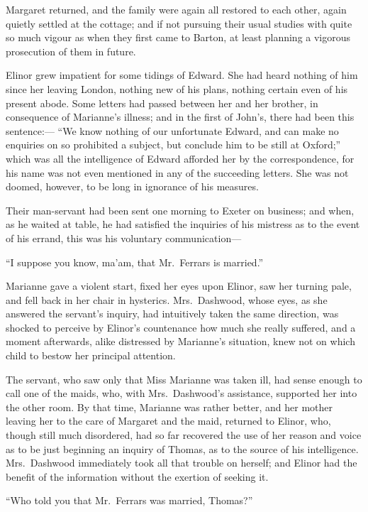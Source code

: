 Margaret returned, and the family were again all
restored to each other, again quietly settled at the cottage;
and if not pursuing their usual studies with quite
so much vigour as when they first came to Barton,
at least planning a vigorous prosecution of them in future.

Elinor grew impatient for some tidings of Edward.
She had heard nothing of him since her leaving London,
nothing new of his plans, nothing certain even of his
present abode.  Some letters had passed between her
and her brother, in consequence of Marianne's illness;
and in the first of John's, there had been this sentence:---%
``We know nothing of our unfortunate Edward, and can make no
enquiries on so prohibited a subject, but conclude him
to be still at Oxford;'' which was all the intelligence
of Edward afforded her by the correspondence, for his name
was not even mentioned in any of the succeeding letters.
She was not doomed, however, to be long in ignorance of
his measures.

Their man-servant had been sent one morning to Exeter
on business; and when, as he waited at table, he had
satisfied the inquiries of his mistress as to the event
of his errand, this was his voluntary communication---%

``I suppose you know, ma'am, that Mr.\ Ferrars is married.''

Marianne gave a violent start, fixed her eyes
upon Elinor, saw her turning pale, and fell back in her
chair in hysterics.  Mrs.\ Dashwood, whose eyes, as she
answered the servant's inquiry, had intuitively taken
the same direction, was shocked to perceive by Elinor's
countenance how much she really suffered, and a moment
afterwards, alike distressed by Marianne's situation,
knew not on which child to bestow her principal attention.

The servant, who saw only that Miss Marianne was
taken ill, had sense enough to call one of the maids,
who, with Mrs.\ Dashwood's assistance, supported her into
the other room.  By that time, Marianne was rather better,
and her mother leaving her to the care of Margaret
and the maid, returned to Elinor, who, though still
much disordered, had so far recovered the use of her reason
and voice as to be just beginning an inquiry of Thomas,
as to the source of his intelligence.  Mrs.\ Dashwood
immediately took all that trouble on herself; and Elinor
had the benefit of the information without the exertion
of seeking it.

``Who told you that Mr.\ Ferrars was married, Thomas?''

